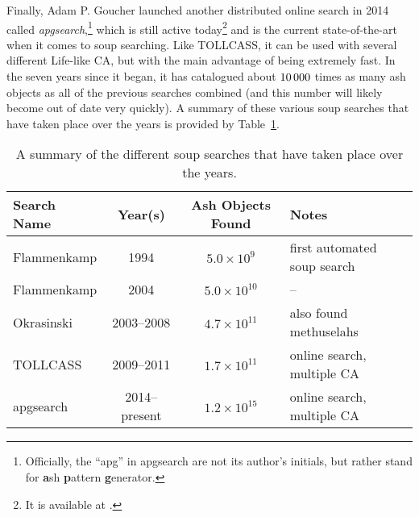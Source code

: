 Finally, Adam P. Goucher launched another distributed online search in 2014 called \emph{apgsearch},\footnote{Officially, the ``apg'' in apgsearch are not its author's initials, but rather stand for \textbf{a}sh \textbf{p}attern \textbf{g}enerator.} which is still active today\footnote{It is available at .} and is the current state-of-the-art when it comes to soup searching. Like TOLLCASS, it can be used with several different Life-like CA, but with the main advantage of being extremely fast. In the seven years since it began, it has catalogued about $10{\,}000$ times as many ash objects as all of the previous searches combined (and this number will likely become out of date very quickly). A summary of these various soup searches that have taken place over the years is provided by Table~\ref{tab:ash_searches}.

\begin{table}[!htb]\vspace*{0.05in}
	\begin{center}		
		\begin{tabular}{l c c l}
			\toprule
			Search Name & Year(s) & Ash Objects Found & Notes \\ \midrule
			Flammenkamp & 1994 & $5.0 \times 10^9$ & first automated soup search \\
			\rowcolor{gray!20} Flammenkamp & 2004 & $5.0 \times 10^{10}$ & -- \\
			Okrasinski & 2003--2008 & $4.7 \times 10^{11}$ & also found methuselahs \\
			\rowcolor{gray!20} TOLLCASS & 2009--2011 & $1.7 \times 10^{11}$ & online search, multiple CA \\
			apgsearch & 2014--present & $1.2 \times 10^{15}$ & online search, multiple CA \\
			\bottomrule
		\end{tabular}
		\caption{A summary of the different soup searches that have taken place over the years.}\label{tab:ash_searches}
	\end{center}
\end{table}


\filbreak


